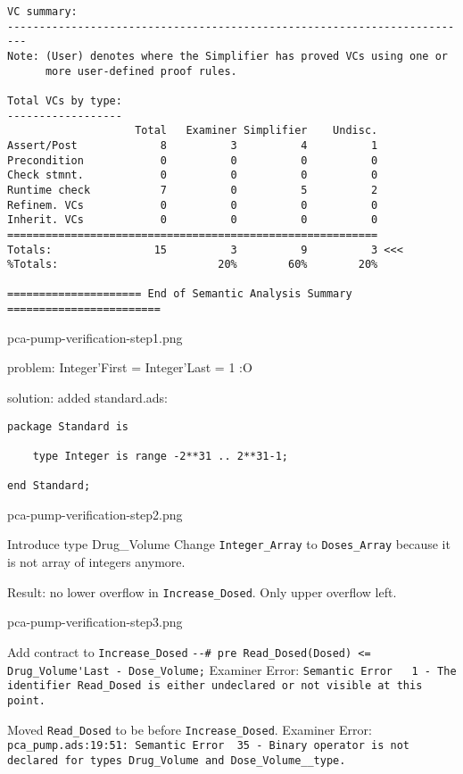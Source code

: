 \begin{lstlisting}[frame=single, gobble=0, caption={POGS report}, label={listing:pcapump_dosemonitor_pogs}]
VC summary:
-------------------------------------------------------------------------
Note: (User) denotes where the Simplifier has proved VCs using one or
      more user-defined proof rules.

Total VCs by type:
------------------
                    Total   Examiner Simplifier    Undisc.
Assert/Post             8          3          4          1
Precondition            0          0          0          0
Check stmnt.            0          0          0          0
Runtime check           7          0          5          2
Refinem. VCs            0          0          0          0
Inherit. VCs            0          0          0          0
==========================================================
Totals:                15          3          9          3 <<<
%Totals:                         20%        60%        20%

===================== End of Semantic Analysis Summary ========================

\end{lstlisting}

pca-pump-verification-step1.png

problem: Integer'First = Integer'Last = 1 :O

solution: added standard.ads:

\begin{lstlisting}
package Standard is

    type Integer is range -2**31 .. 2**31-1;

end Standard;
\end{lstlisting}

pca-pump-verification-step2.png

Introduce type Drug\_Volume
Change \lstinline{Integer_Array} to \lstinline{Doses_Array} because it is not array of integers anymore.

Result: no lower overflow in \lstinline{Increase_Dosed}. Only upper overflow left.

pca-pump-verification-step3.png

Add contract to \lstinline{Increase_Dosed} \lstinline{--# pre Read_Dosed(Dosed) <= Drug_Volume'Last - Dose_Volume;}
Examiner Error: \lstinline{Semantic Error   1 - The identifier Read_Dosed is either undeclared or not visible at this point.}


Moved \lstinline{Read_Dosed} to be before \lstinline{Increase_Dosed}.
Examiner Error: \lstinline{pca_pump.ads:19:51: Semantic Error  35 - Binary operator is not declared for types Drug_Volume and Dose_Volume__type.}

